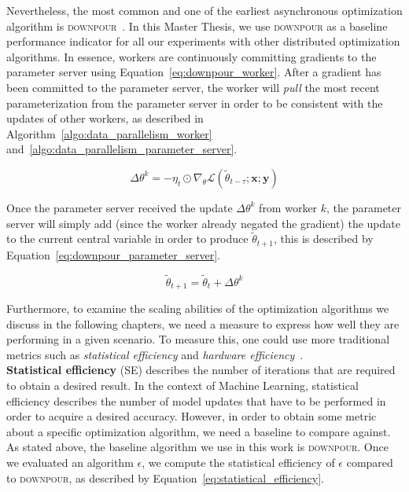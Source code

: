 Nevertheless, the most common and one of the earliest asynchronous optimization algorithm is \textsc{downpour}~\cite{dean2012large}. In this Master Thesis, we use \textsc{downpour} as a baseline performance indicator for all our experiments with other distributed optimization algorithms. In essence, workers are continuously committing gradients to the parameter server using Equation~\ref{eq:downpour_worker}. After a gradient has been committed to the parameter server, the worker will \emph{pull} the most recent parameterization from the parameter server in order to be consistent with the updates of other workers, as described in Algorithm~\ref{algo:data_parallelism_worker} and~\ref{algo:data_parallelism_parameter_server}.

\begin{equation}
  \label{eq:downpour_worker}
  \Delta \theta^k = - \eta_t \odot \nabla_\theta \mathcal{L}(\tilde{\theta}_{t-\tau};\textbf{x};\textbf{y})
\end{equation}

\newpage

Once the parameter server received the update $\Delta\theta^k$ from worker $k$, the parameter server will simply add (since the worker already negated the gradient) the update to the current central variable in order to produce $\tilde{\theta}_{t+1}$, this is described by Equation~\ref{eq:downpour_parameter_server}.

\begin{equation}
  \label{eq:downpour_parameter_server}
  \tilde{\theta}_{t+1} = \tilde{\theta}_t + \Delta \theta^k
\end{equation}

Furthermore, to examine the scaling abilities of the optimization algorithms we discuss in the following chapters, we need a measure to express how well they are performing in a given scenario. To measure this, one could use more traditional metrics such as \emph{statistical efficiency} and \emph{hardware efficiency}~\cite{hadjis2016omnivore, implicitmomentum}.\\

\textbf{Statistical efficiency} (SE) describes the number of iterations that are required to obtain a desired result. In the context of Machine Learning, statistical efficiency describes the number of model updates that have to be performed in order to acquire a desired accuracy. However, in order to obtain some metric about a specific optimization algorithm, we need a baseline to compare against. As stated above, the baseline algorithm we use in this work is \textsc{downpour}. Once we evaluated an algorithm $\epsilon$, we compute the statistical efficiency of $\epsilon$ compared to \textsc{downpour}, as described by Equation~\ref{eq:statistical_efficiency}.

